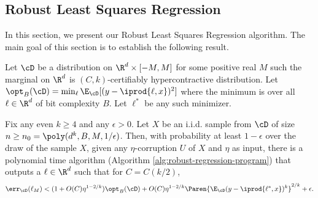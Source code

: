 
\subsection{Robust Least Squares Regression} \label{sec:robust-L2-regression-algo}
In this section, we present our Robust Least Squares Regression algorithm. The main goal of this section is to establish the following result. 


\newcommand{\clip}{\mathsf{clip}}
\begin{theorem} \label{thm:analysis-L2-linear-regression}
Let $\cD$ be a distribution on $\R^d \times [-M,M]$ for some positive real $M$ such the marginal on $\R^d$ is $(C,k)$-certifiably hypercontractive distribution. Let $\opt_B(\cD) = \min_{\ell} \E_{\cD}[ (y - \iprod{\ell,x})^2]$ where the minimum is over all $\ell \in \R^d$ of bit complexity $B$. Let $\ell^{*}$ be any such minimizer. %

Fix any even $k \geq 4$ and any $\epsilon > 0$. Let $X$ be an i.i.d. sample from $\cD$ of size $n \geq n_0 = \poly(d^k, B, M, 1/\epsilon)$. %
Then, with probability at least $1-\epsilon$ over the draw of the sample $X$, given any $\eta$-corruption $U$ of $X$ and $\eta$ as input, there is a polynomial time algorithm (Algorithm \ref{alg:robust-regression-program}) that outputs a $\ell \in \R^d$ such that for $C = C(k/2)$, 
\[
\err_{\cD}(\ell_M) < (1 + O(C)\eta^{1-2/k}) \opt_B(\cD) + O(C) \eta^{1-2/k} \Paren{\E_{\cD} (y-\iprod{\ell^{*},x})^k}^{2/k} + \epsilon
.
\] 
\end{theorem}


